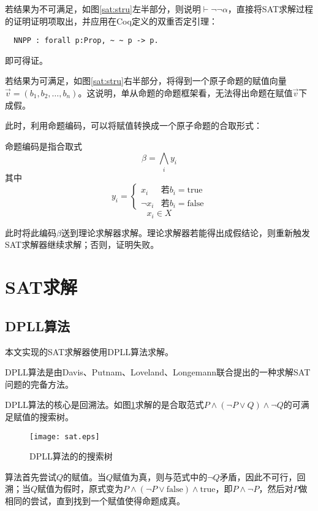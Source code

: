 若结果为不可满足，如图\ref{sat:stru}左半部分，则说明$\vdash \lnot \lnot \alpha$，直接将SAT求解过程的证明证明项取出，并应用在Coq定义的双重否定引理：
\begin{verbatim}
  NNPP : forall p:Prop, ~ ~ p -> p.
\end{verbatim}
即可得证。

若结果为可满足，如图\ref{sat:stru}右半部分，将得到一个原子命题的赋值向量$\vec{v}=(b_1, b_2, \dots , b_n)$。这说明，单从命题的命题框架看，无法得出命题在赋值$\vec{v}$下成假。

此时，利用命题编码，可以将赋值转换成一个原子命题的合取形式：
\begin{definition}[命题编码]命题编码是指合取式
  $$\beta = \bigwedge_i y_i$$
  其中
  \begin{equation*}
    y_i =
    \begin{cases}
      x_i & \text{若}b_i = \mathrm{true} \\
      \lnot x_i & \text{若}b_i = \mathrm{false}
    \end{cases}
  \end{equation*}
  $$ x_i \in X $$
\end{definition}


此时将此编码$\beta$送到理论求解器求解。理论求解器若能得出成假结论，则重新触发SAT求解器继续求解；否则，证明失败。

\section{SAT求解}
\subsection{DPLL算法}
本文实现的SAT求解器使用DPLL算法求解。

DPLL算法是由Davis、Putnam、Loveland、Longemann联合提出的一种求解SAT问题的完备方法。

DPLL算法的核心是回溯法。如图\ref{sat:dpll}求解的是合取范式$P \land (\lnot P \lor Q) \land \lnot Q$的可满足赋值的搜索树。

\begin{figure}[!htbp]
  \centering
  \texttt{[image: sat.eps]}
  \caption{DPLL算法的的搜索树}
  \label{sat:dpll}
\end{figure}

算法首先尝试$Q$的赋值。当$Q$赋值为真，则与范式中的$\lnot Q$矛盾，因此不可行，回溯；当$Q$赋值为假时，原式变为$P \land (\lnot P \lor \mathrm{false}) \land \mathrm{true}$，即$P \land \lnot P$，然后对$P$做相同的尝试，直到找到一个赋值使得命题成真。

